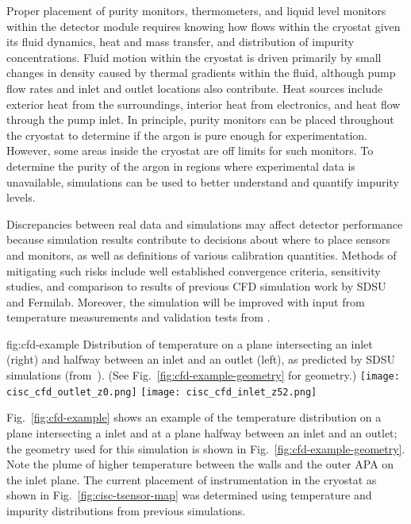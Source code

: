 Proper placement of purity monitors, thermometers, and liquid level monitors within the detector module requires knowing how  flows within the cryostat given its fluid dynamics, heat and mass transfer, and distribution of impurity concentrations. Fluid motion within the cryostat is driven primarily by small changes in density caused by thermal gradients within the fluid, although pump flow rates and inlet and outlet locations also contribute. Heat sources include exterior heat from the surroundings, interior heat from electronics, and heat flow through the pump inlet. In principle, purity monitors can be placed throughout the cryostat to determine if the argon is pure enough for experimentation. However, some areas inside the cryostat are off limits for such monitors. To determine the purity of the argon in regions where experimental data is unavailable,  simulations can be used to better understand and quantify impurity levels.

Discrepancies between real data and simulations may affect detector performance because simulation results contribute to decisions about where to place sensors and monitors, as well as definitions of various calibration quantities. Methods of mitigating such risks include well established convergence criteria, sensitivity studies, and comparison to results of previous CFD simulation work by SDSU and Fermilab. Moreover, the simulation will be improved with input from temperature measurements and validation tests from .

\begin{dunefigure}{fig:cfd-example}
  {Distribution of temperature on a plane intersecting an inlet (right) and halfway between an inlet and an outlet (left), as predicted by SDSU  simulations (from~\cite{docdb-5915}). (See Fig.~\ref{fig:cfd-example-geometry} for geometry.)}
  \texttt{[image: cisc\_cfd\_outlet\_z0.png]}
  \texttt{[image: cisc\_cfd\_inlet\_z52.png]}
\end{dunefigure}

Fig.~\ref{fig:cfd-example} shows an example of the temperature
distribution on a plane intersecting a  inlet and at a
plane halfway between an inlet and an outlet; 
the geometry used for
this simulation is shown in Fig.~\ref{fig:cfd-example-geometry}. Note the plume of higher temperature  between the walls and
the outer APA on the inlet plane. The current placement of instrumentation in
the cryostat as shown in Fig.~\ref{fig:cisc-tsensor-map} was determined using temperature and impurity distributions from previous simulations.

